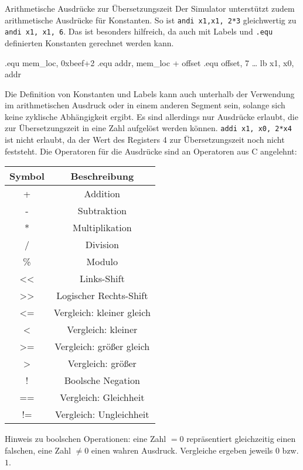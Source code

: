 \begin{infoblock}{Arithmetische Ausdrücke zur Übersetzungszeit}
	Der Simulator unterstützt zudem arithmetische Ausdrücke für Konstanten. So ist \texttt{andi x1,x1, 2*3} gleichwertig zu \texttt{andi x1, x1, 6}. Das ist besonders hilfreich, da auch mit Labels und \texttt{.equ} definierten Konstanten gerechnet werden kann.\\
	\begin{riscv}
		.equ mem_loc, 0xbeef+2
		.equ addr, mem_loc + offset
		.equ offset, 7
		\dots
		lb x1, x0, addr
	\end{riscv}

  Die Definition von Konstanten und Labels kann auch unterhalb der Verwendung im
  arithmetischen Ausdruck oder in einem anderen Segment sein, solange sich keine
  zyklische Abhängigkeit ergibt. Es sind allerdings nur Ausdrücke erlaubt, die
  zur Übersetzungszeit in eine Zahl aufgelöst werden können. \texttt{addi x1,
  x0, 2*x4} ist nicht erlaubt, da der Wert des Registers 4 zur Übersetzungszeit
  noch nicht feststeht. Die Operatoren für die Ausdrücke sind an Operatoren aus
  C angelehnt:

	\begin{center}
    \begin{tabular}{cc}
      \textbf{Symbol} & \textbf{Beschreibung}\\
      \toprule
      + & Addition \\
      - & Subtraktion \\
      * & Multiplikation \\
      / & Division \\
      \% & Modulo \\
      << & Links-Shift\\
      >> & Logischer Rechts-Shift\\
      <= & Vergleich: kleiner gleich\\
      < & Vergleich: kleiner\\
      >= & Vergleich: größer gleich\\
      > & Vergleich: größer\\
      ! & Boolsche Negation\\
      == & Vergleich: Gleichheit\\
      != & Vergleich: Ungleichheit\\
    \end{tabular}
	\end{center}

	Hinweis zu boolschen Operationen: eine Zahl $=0$ repräsentiert gleichzeitig
	einen falschen, eine Zahl $\neq 0$ einen wahren Ausdruck. Vergleiche ergeben
	jeweils $0$ bzw. $1$.

\end{infoblock}

